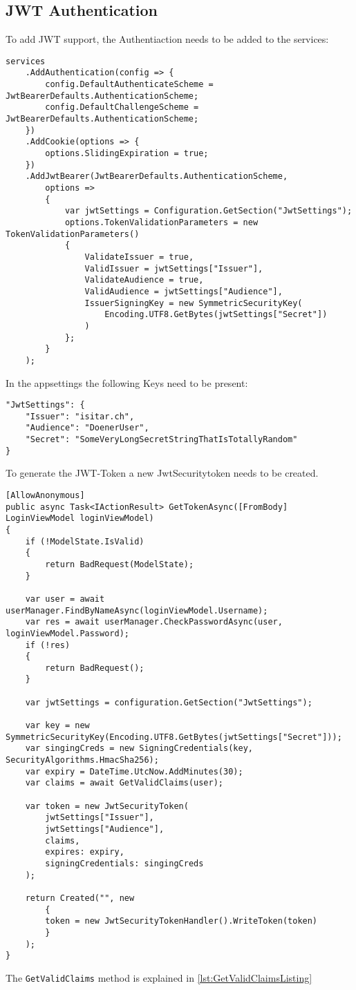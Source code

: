 \documentclass[12pt, a4paper]{article}
\begin{document}
\subsection{JWT Authentication}
To add JWT support, the Authentiaction needs to be added to the services:

\begin{lstlisting}
services
	.AddAuthentication(config => {
		config.DefaultAuthenticateScheme = JwtBearerDefaults.AuthenticationScheme;
		config.DefaultChallengeScheme =	JwtBearerDefaults.AuthenticationScheme;
	})
	.AddCookie(options => {
		options.SlidingExpiration = true; 
	})
	.AddJwtBearer(JwtBearerDefaults.AuthenticationScheme,
		options =>
		{
			var jwtSettings = Configuration.GetSection("JwtSettings"); 
			options.TokenValidationParameters = new TokenValidationParameters()
			{
				ValidateIssuer = true,
				ValidIssuer = jwtSettings["Issuer"],
				ValidateAudience = true,
				ValidAudience = jwtSettings["Audience"],
				IssuerSigningKey = new SymmetricSecurityKey(
					Encoding.UTF8.GetBytes(jwtSettings["Secret"])
				)
			};
		}
	);
\end{lstlisting}
In the appsettings the following Keys need to be present:
\begin{lstlisting}
"JwtSettings": {
	"Issuer": "isitar.ch",
	"Audience": "DoenerUser",
	"Secret": "SomeVeryLongSecretStringThatIsTotallyRandom"
}
\end{lstlisting}

To generate the JWT-Token a new JwtSecuritytoken needs to be created.
\begin{lstlisting}
[AllowAnonymous]
public async Task<IActionResult> GetTokenAsync([FromBody] LoginViewModel loginViewModel)
{
	if (!ModelState.IsValid)
	{
		return BadRequest(ModelState);
	}
	
	var user = await userManager.FindByNameAsync(loginViewModel.Username);
	var res = await userManager.CheckPasswordAsync(user, loginViewModel.Password);
	if (!res)
	{
		return BadRequest();
	}
	
	var jwtSettings = configuration.GetSection("JwtSettings");
	
	var key = new SymmetricSecurityKey(Encoding.UTF8.GetBytes(jwtSettings["Secret"]));
	var singingCreds = new SigningCredentials(key, SecurityAlgorithms.HmacSha256);
	var expiry = DateTime.UtcNow.AddMinutes(30);
	var claims = await GetValidClaims(user);
	
	var token = new JwtSecurityToken(
		jwtSettings["Issuer"],
		jwtSettings["Audience"],
		claims,
		expires: expiry,
		signingCredentials: singingCreds
	);
	
	return Created("", new
		{
		token = new JwtSecurityTokenHandler().WriteToken(token)
		}
	);
}
\end{lstlisting}
The \lstinline|GetValidClaims| method is explained in \autoref{lst:GetValidClaimsListing} 
\end{document}
